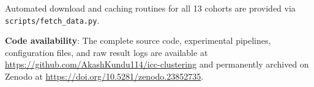 \documentclass[pdflatex,sn-mathphys-num]{sn-jnl}
\theoremstyle{thmstyleone}
\theoremstyle{thmstyletwo}
\theoremstyle{thmstylethree}
\begin{document}
Automated download and caching routines for all 13 cohorts are provided via \texttt{scripts/fetch\_data.py}.

\textbf{Code availability}: The complete source code, experimental pipelines, configuration files, and raw result logs are available at \url{https://github.com/AkashKundu114/icc-clustering} and permanently archived on Zenodo at \url{https://doi.org/10.5281/zenodo.23852735}.


\end{document}
